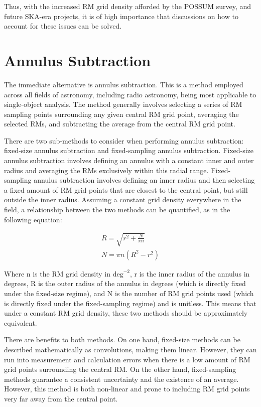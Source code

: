 Thus, with the increased RM grid density afforded by the POSSUM survey, and future SKA-era projects, it is of high importance that discussions on how to account for these issues can be solved.

\section{Annulus Subtraction}
\label{sec:annulus}

The immediate alternative is annulus subtraction. This is a method employed across all fields of astronomy, including radio astronomy, being most applicable to single-object analysis. The method generally involves selecting a series of RM sampling points surrounding any given central RM grid point, averaging the selected RMs, and subtracting the average from the central RM grid point.

There are two sub-methods to consider when performing annulus subtraction: fixed-size annulus subtraction and fixed-sampling annulus subtraction. Fixed-size annulus subtraction involves defining an annulus with a constant inner and outer radius and averaging the RMs exclusively within this radial range. Fixed-sampling annulus subtraction involves defining an inner radius and then selecting a fixed amount of RM grid points that are closest to the central point, but still outside the inner radius. Assuming a constant grid density everywhere in the field, a relationship between the two methods can be quantified, as in the following equation:

\begin{equation}
    \begin{split}
        R = \sqrt{r^2 + \frac{N}{\pi n}} \\
        N = \pi n \left( R^2 - r^2 \right)
    \end{split}
    \label{eq:annulus}
\end{equation}

Where n is the RM grid density in $\mathrm{deg}^{-2}$, r is the inner radius of the annulus in degrees, R is the outer radius of the annulus in degrees (which is directly fixed under the fixed-size regime), and N is the number of RM grid points used (which is directly fixed under the fixed-sampling regime) and is unitless. This means that under a constant RM grid density, these two methods should be approximately equivalent.


There are benefits to both methods. On one hand, fixed-size methods can be described mathematically as convolutions, making them linear. However, they can run into measurement and calculation errors when there is a low amount of RM grid points surrounding the central RM. On the other hand, fixed-sampling methods guarantee a consistent uncertainty and the existence of an average. However, this method is both non-linear and prone to including RM grid points very far away from the central point.



